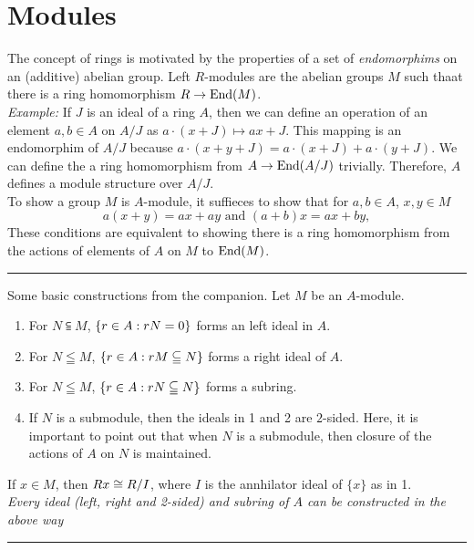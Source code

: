 \chapter{Modules}

The concept of rings is motivated by the properties of a set of \textit{endomorphims} on an (additive) abelian group. Left $R$-modules are the abelian groups $M$ such thaat there is a ring homomorphism $R \to \text{End}(M)$.\\

\noindent \textit{Example:} If $J$ is an ideal of a ring $A$, then we can define an operation of an element $a, b \in A$ on $A/J$ as $a \cdot (x + J) \mapsto ax + J.$ This mapping is an endomorphim of $A/J$ because $a \cdot (x + y + J) = a \cdot (x + J) + a\cdot (y + J)$. We can define the a ring homomorphism from $A \to \text{End}(A/J)$ trivially.  Therefore, $A$ defines a module structure over $A/J$.\\

To show a group $M$ is $A$-module, it suffieces to show that for $a, b \in A$, $x, y \in M$ 
$$a(x + y) = ax + ay \text{ and } (a + b)x = ax + by,$$
These conditions are equivalent to showing there is a ring homomorphism from the actions of elements of $A$ on $M$ to $\text{End}(M)$.\\
\noindent\rule{\textwidth}{1pt}    
    \noindent Some basic constructions from the companion. Let $M$ be an $A$-module.
    \begin{enumerate}
        \item For $N \subseteqq M$, $\{r \in A : rN = 0\}$ forms an left ideal in $A$.
        \item For $N \leqq M$, $\{r \in A: rM \subseteqq N\}$ forms a right ideal of $A$.
        \item For $N \leqq M$, $\{r \in A: rN \subseteqq N\}$ forms a subring.
        \item If $N$ is a submodule, then the ideals in 1 and 2 are $2$-sided. Here, it is important to point out that when $N$ is a submodule, then closure of the actions of $A$ on $N$ is maintained.
    \end{enumerate}
    If $x \in M$, then $Rx \cong R/I$, where $I$ is the annhilator ideal of $\{x\}$ as in 1. \\
    
    \noindent \textit{Every ideal (left, right and 2-sided) and subring of $A$ can be constructed in the above way}\\

    \noindent  
    \noindent\rule{\textwidth}{1pt}

